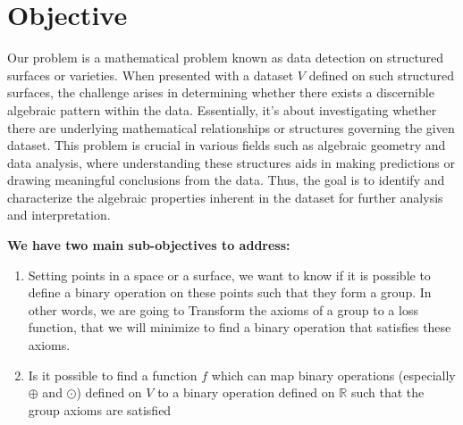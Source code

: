 \documentclass{report}
\begin{document}
        \section{Objective}
        Our problem is a mathematical problem known 
        as data detection on structured surfaces or 
        varieties. When presented with a dataset $V$ 
        defined on such structured surfaces, the challenge 
        arises in determining whether there exists a 
        discernible algebraic pattern within the data. 
        Essentially, it's about investigating whether 
        there are underlying mathematical relationships 
        or structures governing the given dataset. 
        This problem is crucial in various fields 
        such as algebraic geometry and data analysis, 
        where understanding these structures aids in 
        making predictions or drawing meaningful 
        conclusions from the data. Thus, the goal 
        is to identify and characterize the algebraic
        properties inherent in the dataset for further
        analysis and interpretation.\\



        \textbf{We have two main sub-objectives to address:}

        \begin{enumerate}
            \item Setting  points in a space or a surface, we want to know if it is possible to define a binary operation on these points such that they form a group. In other words, 
            we are going to Transform the axioms of a group to a loss function, that we will minimize to find a binary operation that satisfies these axioms.
                \item Is it possible to find a function  $f$ which can map binary operations (especially $\oplus$ and $\odot$) defined on $V$ to a binary operation defined on $\mathbb{R}$ such that the group axioms are satisfied
            \end{enumerate}
\end{document}

